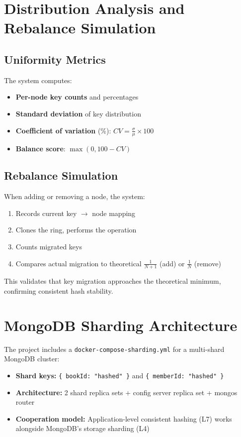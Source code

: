 \documentclass[12pt,a4paper]{report}
\begin{document}
\section{Distribution Analysis and Rebalance Simulation}

\subsection{Uniformity Metrics}
The system computes:
\begin{itemize}[noitemsep]
    \item \textbf{Per-node key counts} and percentages
    \item \textbf{Standard deviation} of key distribution
    \item \textbf{Coefficient of variation} (\%): $CV = \frac{\sigma}{\mu} \times 100$
    \item \textbf{Balance score}: $\max(0, 100 - CV)$
\end{itemize}

\subsection{Rebalance Simulation}
When adding or removing a node, the system:
\begin{enumerate}[noitemsep]
    \item Records current key $\rightarrow$ node mapping
    \item Clones the ring, performs the operation
    \item Counts migrated keys
    \item Compares actual migration to theoretical $\frac{1}{N+1}$ (add) or $\frac{1}{N}$ (remove)
\end{enumerate}

This validates that key migration approaches the theoretical minimum, confirming consistent hash stability.

\section{MongoDB Sharding Architecture}
The project includes a \texttt{docker-compose-sharding.yml} for a multi-shard MongoDB cluster:
\begin{itemize}[noitemsep]
    \item \textbf{Shard keys:} \texttt{\{ bookId: "hashed" \}} and \texttt{\{ memberId: "hashed" \}}
    \item \textbf{Architecture:} 2 shard replica sets + config server replica set + mongos router
    \item \textbf{Cooperation model:} Application-level consistent hashing (L7) works alongside MongoDB's storage sharding (L4)
\end{itemize}
\end{document}
